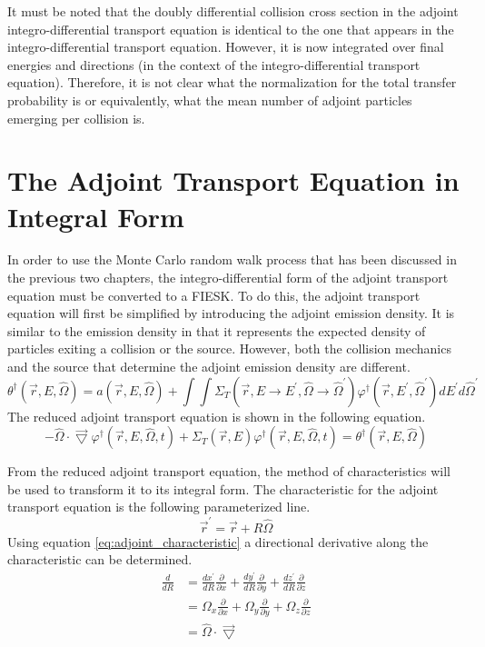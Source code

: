 It must be noted that the doubly differential collision cross section in the
adjoint integro-differential transport equation is identical to the one that
appears in the integro-differential transport equation. However, it is now
integrated over final energies and directions (in the context of the 
integro-differential transport equation). Therefore, it is not clear what the 
normalization for the total transfer probability is or equivalently, what the
mean number of adjoint particles emerging per collision is. 

\section{The Adjoint Transport Equation in Integral Form}
In order to use the Monte Carlo random walk process that has been discussed
in the previous two chapters, the integro-differential form of the adjoint
transport equation must be converted to a FIESK. To do this, the adjoint
transport equation will first be simplified by introducing the adjoint emission
density. It is similar to the emission density in that it represents the 
expected density of particles exiting a collision or the source. However, both
the collision mechanics and the source that determine the adjoint emission 
density are different.
\begin{equation}
  \theta^{\dagger}(\vec{r},E,\hat{\Omega}) = a(\vec{r},E,\hat{\Omega}) +
  \int\int \Sigma_T(\vec{r},E \to E^{'},\hat{\Omega} \to \hat{\Omega}^{'})
  \varphi^{\dagger}(\vec{r},E^{'},\hat{\Omega}^{'}) dE^{'}d\hat{\Omega}^{'}
  \label{eq:adjoint_emission_density}
\end{equation}
The reduced adjoint transport equation is shown in the following equation.
\begin{equation}
  -\hat{\Omega} \cdot \vec{\bigtriangledown} 
    \varphi^{\dagger}(\vec{r},E,\hat{\Omega},t)
    + \Sigma_T(\vec{r},E) \varphi^{\dagger}(\vec{r},E,\hat{\Omega},t) =
    \theta^{\dagger}(\vec{r},E,\hat{\Omega})
\end{equation}
  
From the reduced adjoint transport equation, the method of characteristics will
be used to transform it to its integral form. The characteristic for the 
adjoint transport equation is the following parameterized line.
\begin{equation}
  \vec{r}^{'} = \vec{r} + R\hat{\Omega}
  \label{eq:adjoint_characteristic}
\end{equation}
Using equation \ref{eq:adjoint_characteristic} a directional derivative along
the characteristic can be determined.
\begin{align}
  \frac{d}{dR} & = \frac{dx^{'}}{dR}\frac{\partial}{\partial x} +
  \frac{dy^{'}}{dR}\frac{\partial}{\partial y} +
  \frac{dz^{'}}{dR}\frac{\partial}{\partial z} \nonumber \\
  & = \Omega_x \frac{\partial}{\partial x} +
  \Omega_y \frac{\partial}{\partial y} +
  \Omega_z \frac{\partial}{\partial z} \nonumber \\
  & = \hat{\Omega} \cdot \vec{\bigtriangledown}
\end{align}

